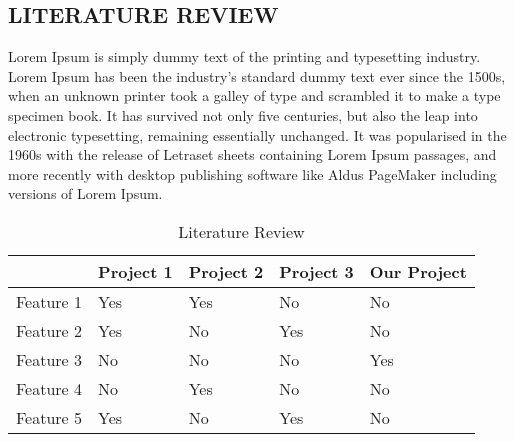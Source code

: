 \begin{center}
	\chapter{LITERATURE REVIEW}
\end{center}

Lorem Ipsum is simply dummy text of the printing and typesetting industry. Lorem Ipsum has been the industry's standard dummy text ever since the 1500s, when an unknown printer took a galley of type and scrambled it to make a type specimen book. It has survived not only five centuries, but also the leap into electronic typesetting, remaining essentially unchanged. It was popularised in the 1960s with the release of Letraset sheets containing Lorem Ipsum passages, and more recently with desktop publishing software like Aldus PageMaker including versions of Lorem Ipsum.
\vspace{1cm}

\begin{table}[h!]
  \begin{center}
    \label{tab:table1}
    \begin{tabular}{|l|l|l|l|l|} 
    \hline
      & Project 1 & Project 2 & Project 3 & Our Project \\
      \hline
Feature 1 & Yes       & Yes       & No        & No        \\
Feature 2 & Yes       & No        & Yes       & No        \\
Feature 3 & No        & No        & No        & Yes       \\
Feature 4 & No        & Yes       & No        & No        \\
Feature 5 & Yes       & No        & Yes       & No        \\
	\hline
    \end{tabular}
    \caption{Literature Review}
  \end{center}
\end{table}